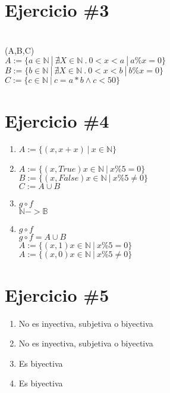 \documentclass{article}
\begin{document}
\section*{Ejercicio \#3}

\\
(A,B,C)\\
{$ A:= \{a \in \mathbb{N}\ |\ \nexists X \in \mathbb{N} \ .\ 0 < x  < a \ |\ a\% x= 0   \}$}\\
{$ B:= \{b \in \mathbb{N}\ |\ \nexists X \in \mathbb{N} \ .\ 0 < x  < b \ |\ b\% x= 0   \}$}\\
{$ C:= \{c \in \mathbb{N}\ |\ c= a\ast b \wedge c < 50  \}$}\\

\section*{Ejercicio \#4}
\begin{enumerate}

        \item{$ A:= \{ (x,x+x)\ |\ x \in \mathbb{N} \}$}
        \item{$A:= \{ (x,True)x \in \mathbb{N} \ |\ x\% 5= 0 \}$\\
        $ B:= \{ (x,False) x \in \mathbb{N} \ |\ x\% 5\neq  0 \}$\\
        $ C:= A\cup B$
        }
        \item{$g\circ f$\\
        $\mathbb{N} -> \mathbb{B}$\\
        }
        \item{$ g\circ f $\\
        $ g\circ f = A\cup B$\\
        $A:= \{ (x,1)x \in \mathbb{N} \ |\ x\% 5= 0 \}$\\
        $A:= \{ (x,0)x \in \mathbb{N} \ |\ x\% 5\neq  0 \}$\\
        }
        \end{enumerate}
\section*{Ejercicio \#5}
\begin{enumerate}

        \item{No es inyectiva, subjetiva o biyectiva}
        \item{No es inyectiva, subjetiva o biyectiva}
        \item{Es biyectiva}
        \item{Es biyectiva}
     

     
\end{enumerate}
\end{document}
